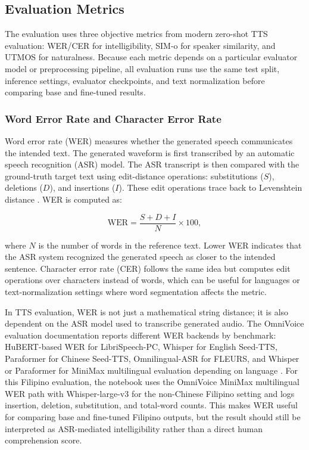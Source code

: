 \documentclass[11pt]{article}
\begin{document}
\subsection{Evaluation Metrics}

The evaluation uses three objective metrics from modern zero-shot TTS evaluation: WER/CER for intelligibility, SIM-o for speaker similarity, and UTMOS for naturalness. Because each metric depends on a particular evaluator model or preprocessing pipeline, all evaluation runs use the same test split, inference settings, evaluator checkpoints, and text normalization before comparing base and fine-tuned results.

\subsubsection{Word Error Rate and Character Error Rate}

Word error rate (WER) measures whether the generated speech communicates the intended text. The generated waveform is first transcribed by an automatic speech recognition (ASR) model. The ASR transcript is then compared with the ground-truth target text using edit-distance operations: substitutions ($S$), deletions ($D$), and insertions ($I$). These edit operations trace back to Levenshtein distance \citep{levenshtein}. WER is computed as:

\begin{equation}
  \mathrm{WER} = \frac{S + D + I}{N} \times 100,
\end{equation}

where $N$ is the number of words in the reference text. Lower WER indicates that the ASR system recognized the generated speech as closer to the intended sentence. Character error rate (CER) follows the same idea but computes edit operations over characters instead of words, which can be useful for languages or text-normalization settings where word segmentation affects the metric.

In TTS evaluation, WER is not just a mathematical string distance; it is also dependent on the ASR model used to transcribe generated audio. The OmniVoice evaluation documentation reports different WER backends by benchmark: HuBERT-based WER for LibriSpeech-PC, Whisper for English Seed-TTS, Paraformer for Chinese Seed-TTS, Omnilingual-ASR for FLEURS, and Whisper or Paraformer for MiniMax multilingual evaluation depending on language \citep{omnivoice,hubert,whisper,paraformer}. For this Filipino evaluation, the notebook uses the OmniVoice MiniMax multilingual WER path with Whisper-large-v3 for the non-Chinese Filipino setting and logs insertion, deletion, substitution, and total-word counts. This makes WER useful for comparing base and fine-tuned Filipino outputs, but the result should still be interpreted as ASR-mediated intelligibility rather than a direct human comprehension score.
\end{document}
